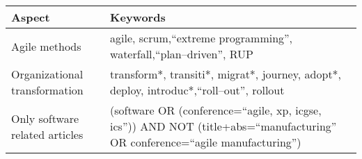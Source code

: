 \centering
{} \label{keywordtable}
\begin{tabular}{l p{30em}}
    \bfseries{Aspect} & \bfseries{Keywords} \\
    \hline
    Agile methods & agile, scrum,``extreme programming'', waterfall,``plan–driven'', RUP \\
    Organizational transformation & transform*, transiti*, migrat*, journey, adopt*, deploy, introduc*,``roll–out'', rollout \\
    Only software related articles & (software OR (conference=``agile, xp,
	icgse, ics'')) AND NOT (title+abs=``manufacturing'' OR conference=``agile
	manufacturing'') \\
\end{tabular}

\justify
